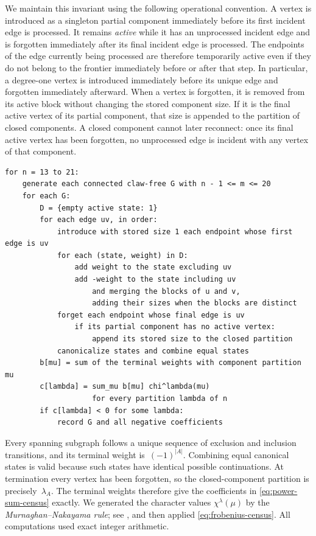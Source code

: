 \documentclass[11pt]{amsart}
\numberwithin{equation}{section}
\theoremstyle{remark}
\begin{document}
We maintain this invariant using the following operational convention.  A
vertex is introduced as a singleton partial component immediately before
its first incident edge is processed.  It remains \emph{active} while it has
an unprocessed incident edge and is forgotten immediately after its final
incident edge is processed.  The endpoints of the edge currently being
processed are therefore temporarily active even if they do not belong to
the frontier immediately before or after that step.  In particular, a
degree-one vertex is introduced immediately before its unique edge and
forgotten immediately afterward.  When a vertex is forgotten, it is removed
from its active block without changing the stored component size.  If it is
the final active vertex of its partial component, that size is appended to
the partition of closed components.  A closed component cannot later
reconnect: once its final active vertex has been forgotten, no unprocessed
edge is incident with any vertex of that component.
\begingroup
\small
\begin{verbatim}
for n = 13 to 21:
    generate each connected claw-free G with n - 1 <= m <= 20
    for each G:
        D = {empty active state: 1}
        for each edge uv, in order:
            introduce with stored size 1 each endpoint whose first edge is uv
            for each (state, weight) in D:
                add weight to the state excluding uv
                add -weight to the state including uv
                    and merging the blocks of u and v,
                    adding their sizes when the blocks are distinct
            forget each endpoint whose final edge is uv
                if its partial component has no active vertex:
                    append its stored size to the closed partition
            canonicalize states and combine equal states
        b[mu] = sum of the terminal weights with component partition mu
        c[lambda] = sum_mu b[mu] chi^lambda(mu)
                    for every partition lambda of n
        if c[lambda] < 0 for some lambda:
            record G and all negative coefficients
\end{verbatim}
\endgroup

Every spanning subgraph follows a unique sequence of exclusion and inclusion
transitions, and its terminal weight is~$(-1)^{\lvert A\rvert}$.  Combining
equal canonical states is valid because such states have identical possible
continuations.  At termination every vertex has been forgotten, so the
closed-component partition is precisely~$\lambda_A$.  The terminal weights
therefore give the coefficients in \cref{eq:power-sum-census} exactly.  We
generated the character values
$\chi^\lambda(\mu)$ by the \emph{Murnaghan--Nakayama rule}; see
\citet[p.~117]{Macdonald1995}, and then applied
\cref{eq:frobenius-census}.  All computations used exact integer arithmetic.
\end{document}

